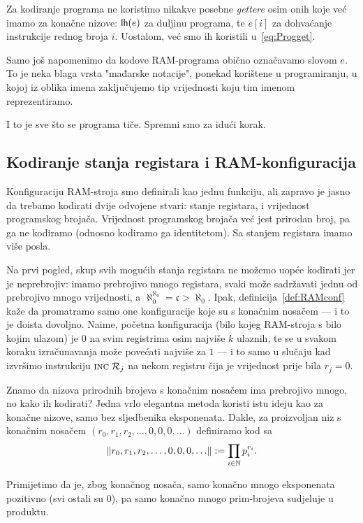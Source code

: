 Za kodiranje programa ne koristimo nikakve posebne \emph{gettere} osim onih koje već imamo za konačne nizove: $\mathsf{lh}(e)$ za duljinu programa, te $e[i]$ za dohvaćanje instrukcije rednog broja $i$. Uostalom, već smo ih koristili u~\eqref{eq:Progget}.

Samo još napomenimo da kodove RAM-programa obično označavamo slovom $e$. To je neka blaga vrsta "mađarske notacije", ponekad korištene u programiranju, u kojoj iz oblika imena zaključujemo tip vrijednosti koju tim imenom reprezentiramo.

I to je sve što se programa tiče. Spremni smo za idući korak.

\subsection{Kodiranje stanja registara i RAM-konfiguracija}

Konfiguraciju RAM-stroja smo definirali kao jednu funkciju, ali zapravo je jasno da trebamo kodirati dvije odvojene stvari: stanje registara, i vrijednost programskog brojača. Vrijednost programskog brojača već jest prirodan broj, pa ga ne kodiramo (odnosno kodiramo ga identitetom). Sa stanjem registara imamo više posla.

Na prvi pogled, skup svih mogućih stanja registara ne možemo uopće kodirati jer je neprebrojiv: imamo prebrojivo mnogo registara, svaki može sadržavati jednu od prebrojivo mnogo vrijednosti, a $\aleph_0^{\aleph_0}=\mathfrak c>\aleph_0$. Ipak, definicija~\ref{def:RAMconf} kaže da promatramo samo one konfiguracije koje su s konačnim nosačem --- i to je doista dovoljno. Naime, početna konfiguracija (bilo kojeg RAM-stroja s bilo kojim ulazom) je $0$ na svim registrima osim najviše $k$ ulaznih, te se u svakom koraku izračunavanja može povećati najviše za $1$ --- i to samo u slučaju kad izvršimo instrukciju $\textsc{inc}\;\mathcal R_{j}$ na nekom registru čija je vrijednost prije bila $r_j=0$.

Znamo da nizova prirodnih brojeva s konačnim nosačem ima prebrojivo mnogo, no kako ih kodirati? Jedna vrlo elegantna metoda koristi istu ideju kao za konačne nizove, samo bez sljedbenika eksponenata. Dakle, za proizvoljan niz s konačnim nosačem $(r_0,r_1,r_2,\dotsc,0,0,0,\dotsc)$ definiramo kod sa
\begin{equation}\label{eq:defkreg}
    \lVert r_0,r_1,r_2,\dotsc,0,0,0,\dotsc\rVert:=\prod_{i\in{\mathbb N}}p_i^{r_i}\text.
\end{equation}

Primijetimo da je, zbog konačnog nosača, samo konačno mnogo eksponenata pozitivno (svi ostali su $0$), pa samo konačno mnogo prim-brojeva sudjeluje u produktu.

